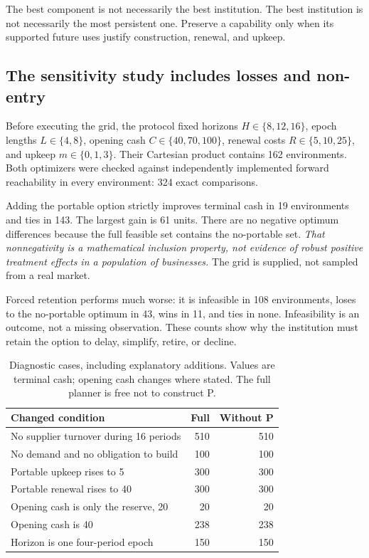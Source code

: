 \begin{insight}
The best component is not necessarily the best institution. The best institution is not necessarily the most persistent one. Preserve a capability only when its supported future uses justify construction, renewal, and upkeep.
\end{insight}

\subsection{The sensitivity study includes losses and non-entry}
Before executing the grid, the protocol fixed horizons $H\in\{8,12,16\}$, epoch lengths $L\in\{4,8\}$, opening cash $C\in\{40,70,100\}$, renewal costs $R\in\{5,10,25\}$, and upkeep $m\in\{0,1,3\}$. Their Cartesian product contains 162 environments. Both optimizers were checked against independently implemented forward reachability in every environment: 324 exact comparisons.

Adding the portable option strictly improves terminal cash in 19 environments and ties in 143. The largest gain is 61 units. There are no negative optimum differences because the full feasible set contains the no-portable set. \emph{That nonnegativity is a mathematical inclusion property, not evidence of robust positive treatment effects in a population of businesses.} The grid is supplied, not sampled from a real market.

Forced retention performs much worse: it is infeasible in 108 environments, loses to the no-portable optimum in 43, wins in 11, and ties in none. Infeasibility is an outcome, not a missing observation. These counts show why the institution must retain the option to delay, simplify, retire, or decline.

\begin{table}[htbp]
\centering\small
\caption{Diagnostic cases, including explanatory additions. Values are terminal cash; opening cash changes where stated. The full planner is free not to construct P.}
\begin{tabularx}{\textwidth}{@{}Xrr@{}}
\toprule
Changed condition & Full & Without P\\
\midrule
No supplier turnover during 16 periods & 510 & 510\\
No demand and no obligation to build & 100 & 100\\
Portable upkeep rises to 5 & 300 & 300\\
Portable renewal rises to 40 & 300 & 300\\
Opening cash is only the reserve, 20 & 20 & 20\\
Opening cash is 40 & 238 & 238\\
Horizon is one four-period epoch & 150 & 150\\
\bottomrule
\end{tabularx}
\end{table}

